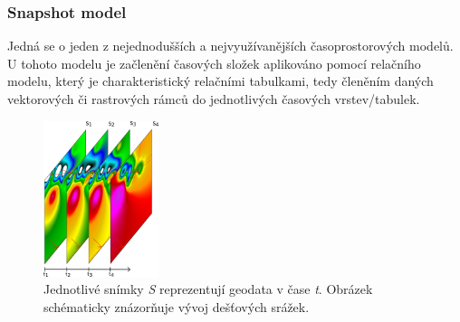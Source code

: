 \documentclass[a4paper,12pt,oneside]{report}
\begin{document}
\subsubsection*{Snapshot model}
Jedná se o jeden z  nejednodušších a nejvyužívanějších časoprostorových
modelů. U tohoto modelu je začlenění časových složek aplikováno pomocí
relačního modelu, který je charakteristický relačními tabulkami, tedy
členěním daných vektorových či rastrových rámců do jednotlivých
časových vrstev/tabulek.

\begin{figure}[h!]
    \centering
    \includegraphics[width=0.3\textwidth]{./img/temporal/snapshot.png}
    \caption[Snapshot model]{Jednotlivé snímky \emph{S} reprezentují  geodata v čase \emph{t}. Obrázek schématicky znázorňuje vývoj dešťových srážek.  \centering \footnotemark }
        \label{fig:snapshot}
 \end{figure}   
\end{document}
